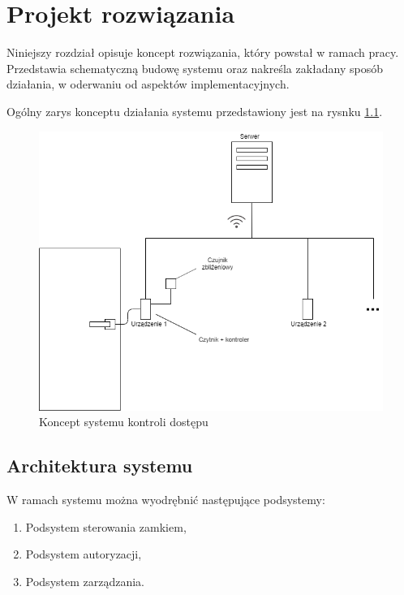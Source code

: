 \chapter{Projekt rozwiązania}
\label{chap:hl-arch}

        Niniejszy rozdział opisuje koncept rozwiązania, który powstał w ramach pracy. Przedstawia schematyczną budowę systemu oraz nakreśla zakładany sposób działania, w oderwaniu od aspektów implementacyjnych.

        Ogólny zarys konceptu działania systemu przedstawiony jest na rysnku \ref{fig:door}.

        \begin{figure}[]
                \includegraphics[width=\linewidth]{chapters/images/door2.png}
                \caption{Koncept systemu kontroli dostępu}
                \label{fig:door}
        \end{figure}

        \section{Architektura systemu}
                W ramach systemu można wyodrębnić następujące podsystemy:
                \begin{enumerate}
                        \item Podsystem sterowania zamkiem,
                        \item Podsystem autoryzacji,
                        \item Podsystem zarządzania.
                \end{enumerate}


